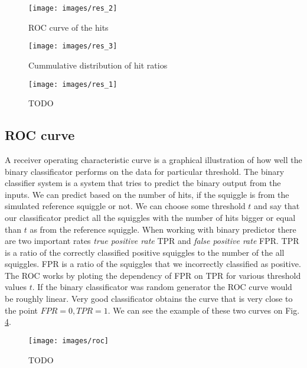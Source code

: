 \begin{figure}
\centerline{\texttt{[image: images/res\_2]}}
\caption[TODO]{ROC curve of the hits}
\label{obr:res_2}
\end{figure}

\begin{figure}
\centerline{\texttt{[image: images/res\_3]}}
\caption[TODO]{Cummulative distribution of hit ratios}
\label{obr:res_3}
\end{figure}

\begin{figure}
\centerline{\texttt{[image: images/res\_1]}}
\caption[TODO]{TODO}
\label{obr:res_1}
\end{figure}

\subsection{ROC curve}

A receiver operating characteristic curve is a graphical illustration of how well
the binary classificator performs on the data for particular threshold. The binary
classifier system is a system that tries to predict the binary output from the inputs.
We can predict based on the number of hits, if the squiggle is from the
simulated reference squiggle or not. We can choose some threshold $t$ and say that
our classificator predict all the squiggles with the number of hits bigger or equal
than $t$ as from the reference squiggle. When working with binary predictor there
are two important rates \textit{true positive rate} TPR and \textit{false positive rate} FPR. 
TPR is a ratio of the correctly classified positive squiggles to the number of the all squiggles.
FPR is a ratio of the squiggles that we incorrectly classified as positive. The ROC
works by ploting the dependency of FPR on TPR for various threshold values $t$.
If the binary classificator was random generator the ROC curve would be roughly
linear. Very good classificator obtains the curve that is very close to the point
$FPR = 0, TPR = 1$. We can see the example of these two curves on Fig. \ref{obr:roc}.

\begin{figure}
\centerline{\texttt{[image: images/roc]}}
\caption[TODO]{TODO}
\label{obr:roc}
\end{figure}

